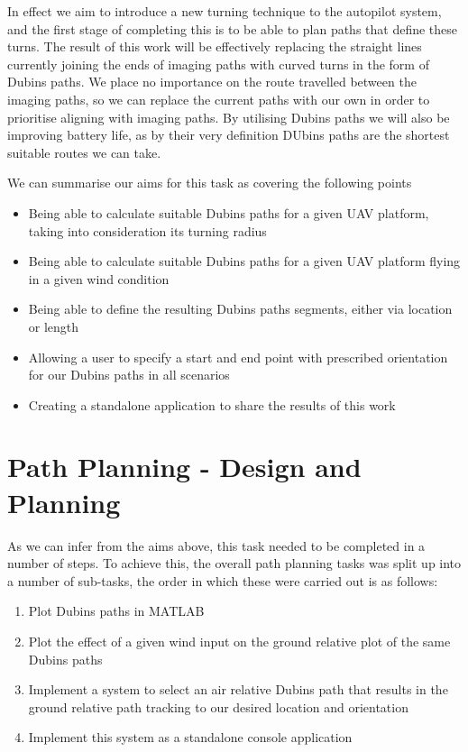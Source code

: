 In effect we aim to introduce a new turning technique to the autopilot system, and the first stage of completing this is to be able to plan paths that define these turns. The result of this work will be effectively replacing the straight lines currently joining the ends of imaging paths with curved turns in the form of Dubins paths. We place no importance on the route travelled between the imaging paths, so we can replace the current paths with our own in order to prioritise aligning with imaging paths. By utilising Dubins paths we will also be improving battery life, as by their very definition DUbins paths are the shortest suitable routes we can take. 

We can summarise our aims for this task as covering the following points

\begin{itemize}
	\item Being able to calculate suitable Dubins paths for a given UAV platform, taking into consideration its turning radius
	\item Being able to calculate suitable Dubins paths for a given UAV platform flying in a given wind condition
	\item Being able to define the resulting Dubins paths segments, either via location or length
	\item Allowing a user to specify a start and end point with prescribed orientation for our Dubins paths in all scenarios
	\item Creating a standalone application to share the results of this work
\end{itemize}

\section{Path Planning - Design and Planning}
\label{task1:design}

As we can infer from the aims above, this task needed to be completed in a number of steps. To achieve this, the overall path planning tasks was split up into a number of sub-tasks, the order in which these were carried out is as follows:

\begin{enumerate}
	\item Plot Dubins paths in MATLAB
	\item Plot the effect of a given wind input on the ground relative plot of the same Dubins paths
	\item Implement a system to select an air relative Dubins path that results in the ground relative path tracking to our desired location and orientation
	\item Implement this system as a standalone console application
\end{enumerate}

